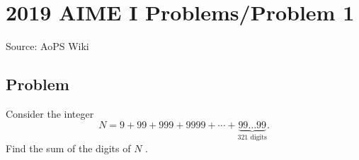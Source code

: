 \documentclass[12pt]{article}
\begin{document}
\section*{{2019 AIME I Problems/Problem 1}}
Source: AoPS Wiki

\subsection*{Problem}
Consider the integer \[N = 9 + 99 + 999 + 9999 + \cdots + \underbrace{99\ldots 99}_\text{321 digits}.\] Find the sum of the digits of $N$ .
\end{document}
